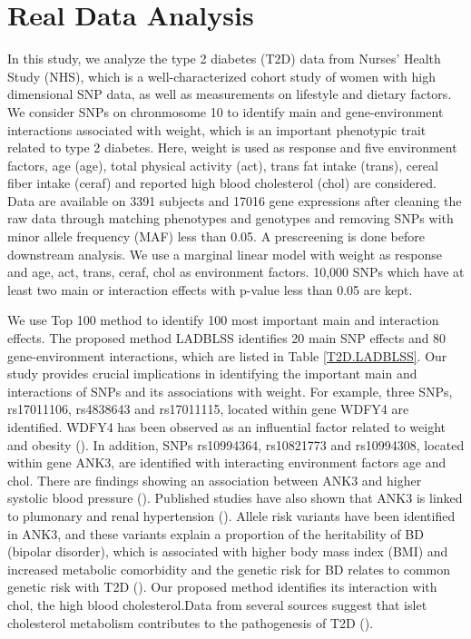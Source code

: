 \documentclass[12pt]{article}
\begin{document}
\section{Real Data Analysis}
In this study, we analyze the type 2 diabetes (T2D) data from Nurses' Health Study (NHS), which is a well-characterized cohort study of women with high dimensional SNP data, as well as measurements on lifestyle and dietary factors. We consider SNPs on chronmosome 10 to identify main and gene-environment interactions associated with weight, which is an important phenotypic trait related to type 2 diabetes. Here, weight is used as response and five environment factors, age (age), total physical activity (act), trans fat intake (trans), cereal fiber intake (ceraf) and reported high blood cholesterol (chol) are considered. Data are available on 3391 subjects and 17016 gene expressions after cleaning the raw data through matching phenotypes and genotypes and removing SNPs with minor allele frequency (MAF) less than 0.05. A prescreening is done before downstream analysis. We use a marginal linear model with weight as response and age, act, trans, ceraf, chol as environment factors. 10,000 SNPs which have at least two main or interaction effects with p-value less than 0.05 are kept.

We use Top 100 method to identify 100 most important main and interaction effects. The proposed method LADBLSS identifies 20 main SNP effects and 80 gene-environment interactions, which are listed in Table \ref{T2D.LADBLSS}. Our study provides crucial implications in identifying the important main and interactions of SNPs and its associations with weight. For example, three SNPs, rs17011106, rs4838643 and rs17011115, located within gene WDFY4 are identified. WDFY4 has been observed as an influential factor related to weight and obesity (\cite{BAR, MARTIN}). In addition, SNPs rs10994364, rs10821773 and rs10994308, located within gene ANK3, are identified with interacting environment factors age and chol. There are findings showing an association between ANK3 and higher systolic blood pressure (\cite{GHAN}). Published studies have also shown that ANK3 is linked to plumonary and renal hypertension (\cite{GHAN}). Allele risk variants have been identified in ANK3, and these variants explain a proportion of the heritability of BD (bipolar disorder), which is associated with higher body mass index (BMI) and increased metabolic comorbidity and the genetic risk for BD relates to common genetic risk with T2D (\cite{WIN}). Our proposed method identifies its interaction with chol, the high blood cholesterol.Data from several sources suggest that islet cholesterol metabolism contributes to the pathogenesis of T2D (\cite{BRUN}). 
\end{document}
